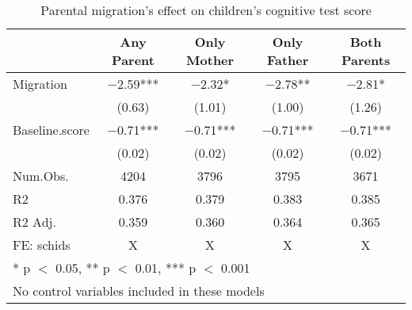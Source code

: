 \documentclass[
  man]{apa7}
\begin{document}
\begin{table}

\caption{Parental migration’s effect on children’s cognitive test score}
\centering
\begin{tabular}[t]{lcccc}
\toprule
  & Any Parent & Only Mother & Only Father & Both Parents\\
\midrule
Migration & \num{-2.59}*** & \num{-2.32}* & \num{-2.78}** & \num{-2.81}*\\
 & (\num{0.63}) & (\num{1.01}) & (\num{1.00}) & (\num{1.26})\\
Baseline.score & \num{-0.71}*** & \num{-0.71}*** & \num{-0.71}*** & \num{-0.71}***\\
 & (\num{0.02}) & (\num{0.02}) & (\num{0.02}) & (\num{0.02})\\
\midrule
Num.Obs. & \num{4204} & \num{3796} & \num{3795} & \num{3671}\\
R2 & \num{0.376} & \num{0.379} & \num{0.383} & \num{0.385}\\
R2 Adj. & \num{0.359} & \num{0.360} & \num{0.364} & \num{0.365}\\
FE: schids & X & X & X & X\\
\bottomrule
\multicolumn{5}{l}{\rule{0pt}{1em}* p $<$ 0.05, ** p $<$ 0.01, *** p $<$ 0.001}\\
\multicolumn{5}{l}{\rule{0pt}{1em}No control variables included in these models}\\
\end{tabular}
\end{table}
\end{document}
